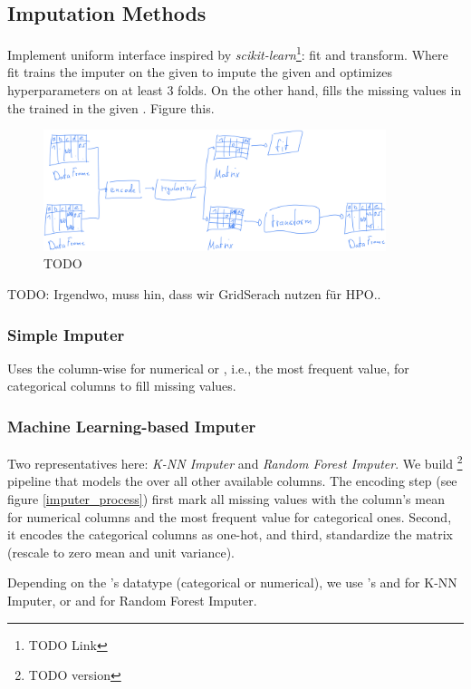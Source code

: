 \subsection{Imputation Methods}
%
Implement uniform interface inspired by \emph{scikit-learn}\footnote{TODO Link}: fit and transform. Where fit trains the imputer on the given  to impute the given   and optimizes hyperparameters on at least 3 folds. On the other hand,  fills the missing values in the trained  in the given . Figure \label{imputer_process} this.
%
\begin{figure}[h!]
	\centering
	\includegraphics[width=10cm]{figures/fit_process}
	\caption{TODO}
	\label{fig:imputer_process}
\end{figure}

TODO: Irgendwo, muss hin, dass wir GridSerach nutzen für HPO..

\subsubsection{Simple Imputer}
%
Uses the column-wise  for numerical or , i.e., the most frequent value,  for categorical columns to fill missing values.


\subsubsection{Machine Learning-based Imputer}
%
Two representatives here: \emph{K-NN Imputer} and \emph{Random Forest Imputer}. We build \footnote{TODO version} pipeline that models the  over all other available columns. The encoding step (see figure \ref{imputer_process}) first mark all missing values with the column's mean for numerical columns and the most frequent value for categorical ones. Second, it encodes the categorical columns as one-hot, and third, standardize  the matrix (rescale to zero mean and unit variance).

Depending on the 's datatype (categorical or numerical), we use 's  and  for K-NN Imputer, or  and  for Random Forest Imputer.


